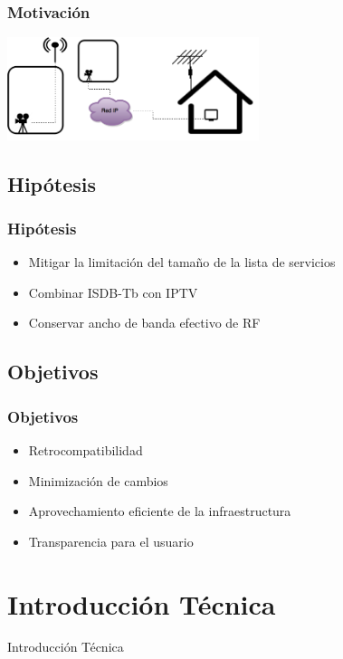 \documentclass[a4paper,11pt]{beamer}
\begin{document}
		\begin{frame}
			\frametitle{Motivación}
			\begin{center}
			\includegraphics[height=3cm]{isdbt_con_ip.png}
			\end{center}

		\end{frame}

	\subsection{Hipótesis}
		\begin{frame}
			\frametitle{Hipótesis}
			\begin{itemize}
				\item Mitigar la limitación del tamaño de la lista de servicios
				\item Combinar ISDB-Tb con IPTV
				\item Conservar ancho de banda efectivo de RF
			\end{itemize}
		\end{frame}

	\subsection{Objetivos}
		\begin{frame}
			\frametitle{Objetivos}
			\begin{itemize}	
				\item Retrocompatibilidad
				\item Minimización de cambios
				\item Aprovechamiento eficiente de la infraestructura
				\item Transparencia para el usuario
			\end{itemize}
		\end{frame}

\section{Introducción Técnica}
\begin{frame}

\begin{center}
\Huge Introducción Técnica
\end{center}

\end{frame}
\end{document}
